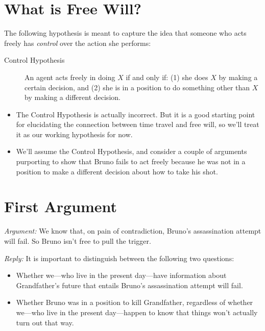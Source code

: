 \documentclass[12pt]{extarticle}
\begin{document}
\fi 



\section{What is Free Will?}

The following hypothesis is meant to capture the idea that someone who acts freely has \emph{control} over the action she performs:
\begin{description}
\item[Control Hypothesis]
An agent acts freely in doing $X$ if and only if: (1) she does $X$ by making a certain decision, and (2) she is in a position to do something other than $X$ by making a different decision.

\end{description}


\begin{itemize}
\item The Control Hypothesis is actually incorrect. But it is a good starting point for elucidating the connection between time travel and free will, so we'll treat it as our working hypothesis for now.

\item We'll assume the Control Hypothesis, and consider a couple of arguments purporting to show that Bruno fails to act freely because he was {not} in a position to make a different decision about how to take his shot.
\end{itemize}


\section{First Argument}

\emph{Argument:} We know that, on pain of contradiction, Bruno's assassination attempt will fail. So Bruno isn't free to pull the trigger.


\vspace{3mm}
\noindent
\emph{Reply:} It is important to distinguish between the following two questions:

\begin{itemize}

\item Whether we---who live in the present day---have information about Grandfather's future that entails Bruno's assassination attempt will fail. 

\item Whether Bruno was in a position to kill Grandfather, regardless of whether we---who live in the present day---happen to know that things won't actually turn out that way.

\end{itemize}
\end{document}
